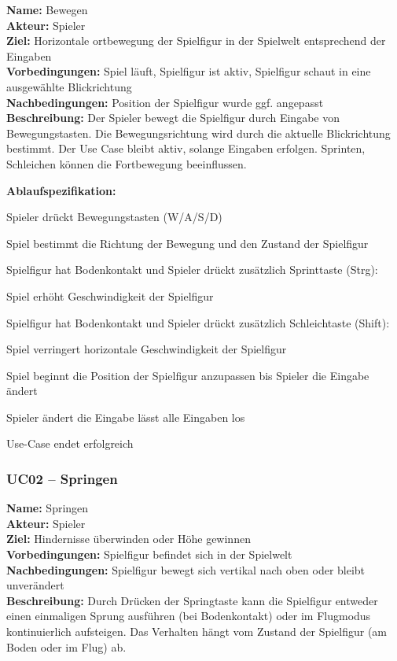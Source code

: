 \documentclass{article}
\newcommand{\opt}{\ensuremath{\parallel}}
\begin{document}
\textbf{Name:} Bewegen \\
\textbf{Akteur:} Spieler \\
\textbf{Ziel:} Horizontale ortbewegung der Spielfigur in der Spielwelt entsprechend der Eingaben \\
\textbf{Vorbedingungen:} Spiel läuft, Spielfigur ist aktiv, Spielfigur schaut in eine ausgewählte Blickrichtung \\
\textbf{Nachbedingungen:} Position der Spielfigur wurde ggf. angepasst \\
\textbf{Beschreibung:} Der Spieler bewegt die Spielfigur durch Eingabe von Bewegungstasten. Die Bewegungsrichtung wird durch die aktuelle Blickrichtung bestimmt. Der Use Case bleibt aktiv, solange Eingaben erfolgen. Sprinten, Schleichen können die Fortbewegung beeinflussen.

\textbf{Ablaufspezifikation:}
\begin{description}[style=nextline,leftmargin=1.9cm,labelwidth=1.6cm]
  \item[1.] Spieler drückt Bewegungstasten (W/A/S/D)
  \item[2.] Spiel bestimmt die Richtung der Bewegung und den Zustand der Spielfigur
  \item[2\opt a.] Spielfigur hat Bodenkontakt und Spieler drückt zusätzlich Sprinttaste (Strg):
  \item[2\opt a.1.] Spiel erhöht Geschwindigkeit der Spielfigur
  \item[2\opt b.] Spielfigur hat Bodenkontakt und Spieler drückt zusätzlich Schleich\-taste (Shift):
  \item[2\opt b.1.] Spiel verringert horizontale Geschwindigkeit der Spielfigur
  \item[2.] Spiel beginnt die Position der Spielfigur anzupassen bis Spieler die Eingabe ändert
  \item[3.] Spieler ändert die Eingabe lässt alle Eingaben los
  \item[4.] Use-Case endet erfolgreich
\end{description}



\subsubsection*{UC02 – Springen}

\textbf{Name:} Springen \\
\textbf{Akteur:} Spieler \\
\textbf{Ziel:} Hindernisse überwinden oder Höhe gewinnen \\
\textbf{Vorbedingungen:} Spielfigur befindet sich in der Spielwelt \\
\textbf{Nachbedingungen:} Spielfigur bewegt sich vertikal nach oben oder bleibt unverändert \\
\textbf{Beschreibung:} Durch Drücken der Springtaste kann die Spielfigur entweder einen einmaligen Sprung ausführen (bei Bodenkontakt) oder im Flugmodus kontinuierlich aufsteigen. Das Verhalten hängt vom Zustand der Spielfigur (am Boden oder im Flug) ab.
\end{document}
